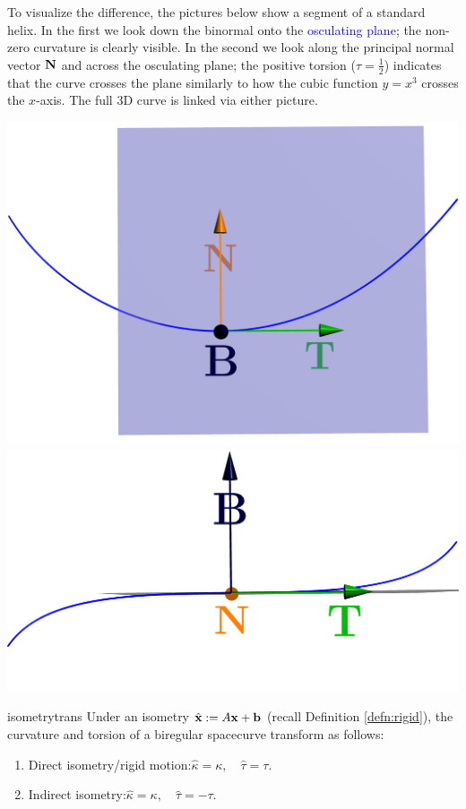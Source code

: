 To visualize the difference, the pictures below show a segment of a standard helix. In the first we look down the binormal onto the \textcolor{blue}{osculating plane}; the non-zero curvature is clearly visible. In the second we look along the principal normal vector ${\mathbf{N}}$ and across the osculating plane; the positive torsion ($\tau=\frac 12$) indicates that the curve crosses the plane similarly to how the cubic function $y=x^3$ crosses the $x$-axis. The full 3D curve is linked via either picture.


\begin{center}
\href{http://www.math.uci.edu/~ndonalds/math162a/frenet-helixstill3.html}{
	\includegraphics[scale=0.12]{frenet-helixstill3.png}
	\qquad
	\includegraphics[scale=0.18]{frenet-helixstill3a.png}
	}
\end{center}

\clearpage


\begin{thm}{}{isometrytrans}
	Under an isometry $\hat{{\mathbf{x}}}:=A{\mathbf{x}}+{\mathbf{b}}$ (recall Definition \ref{defn:rigid}), the curvature and torsion of a biregular spacecurve transform as follows:
	\begin{enumerate}
		\item[]Direct isometry/rigid motion:\quad $\hat{\kappa}=\kappa,\quad\hat{\tau}=\tau$.
		\item[]Indirect isometry:\quad $\hat{\kappa}=\kappa,\quad\hat{\tau}=-\tau$.
	\end{enumerate}
\end{thm}

